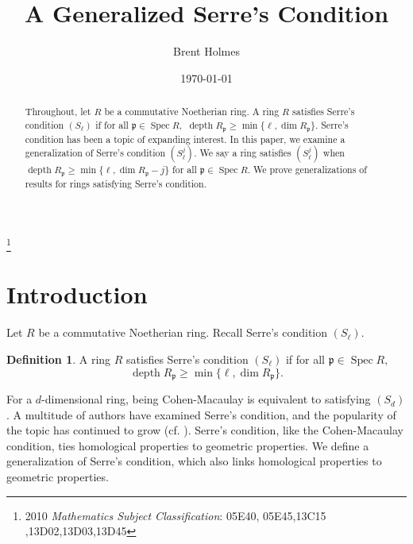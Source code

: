 \documentclass[11pt]{amsart}
\numberwithin{equation}{section}
\theoremstyle{definition}
\newtheorem{defn}[theorem]{Definition}
\theoremstyle{remark}
\newcommand{\Spec}{\operatorname{Spec}}
\newcommand{\depth}{\operatorname{depth}}
\begin{document}
\title[A Generalized Serre's Condition]{A Generalized Serre's Condition}

\author{Brent Holmes}
\address{Department of Mathematics\\
University of Kansas\\
Lawrence, KS 66045-7523 USA}
\date{\today}

\thanks{2010 {\em Mathematics Subject Classification\/}: 05E40, 05E45,13C15 ,13D02,13D03,13D45}



\begin{abstract}
Throughout, let $R$ be a commutative Noetherian ring.  A ring $R$ satisfies Serre's condition $(S_{\ell})$ if for all $\mathfrak{p} \in \Spec R,$ $\depth R_{\mathfrak{p}} \geq \min \{ \ell , \dim R_{\mathfrak{p}} \}$. Serre's condition has been a topic of expanding interest. In this paper, we examine a generalization of Serre's condition $(S_{\ell}^j)$. We say a ring satisfies $(S_{\ell}^j)$ when $\depth R_{\mathfrak{p}} \geq \min \{ \ell , \dim R_{\mathfrak{p}} -j \}$ for all $\mathfrak{p} \in \Spec R$. We prove generalizations of results for rings satisfying Serre's condition.
\end{abstract}


\maketitle

\section{Introduction}

Let $R$ be a commutative Noetherian ring.  Recall Serre's condition $(S_\ell)$.

\begin{defn}
A ring $R$ satisfies Serre's condition $(S_{\ell})$ if for all $\mathfrak{p} \in \Spec R,$ \[\depth R_{\mathfrak{p}} \geq \min \{\ell , \dim R_{\mathfrak{p}} \} .\]
\end{defn}

For a $d$-dimensional ring, being Cohen-Macaulay is equivalent to satisfying $(S_d)$.  A multitude of authors have examined Serre's condition, and the popularity of the topic has continued to grow (cf. \cite{DH16, HT11, MT09, PF14, Te07, Ya00}).  Serre's condition, like the Cohen-Macaulay condition, ties homological properties to geometric properties.  We define a generalization of Serre's condition, which also links homological properties to geometric properties.
\end{document}
